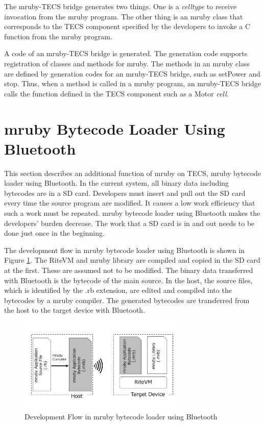 \documentclass[conference,compsoc]{IEEEtran}
\begin{document}
The mruby-TECS bridge generates two things.
One is a {\it celltype} to receive invocation from the mruby program.
The other thing is an mruby class that corresponds to the TECS component specified by the developers to invoke a C function from the mruby program.

A code of an mruby-TECS bridge is generated.
The generation code supports registration of classes and methods for mruby.
The methods in an mruby class are defined by generation codes for an mruby-TECS bridge, such as setPower and stop.
Thus, when a method is called in a mruby program, an mruby-TECS bridge calls the function defined in the TECS component such as a Motor {\it cell}.

 
\section{mruby Bytecode Loader Using Bluetooth}
\label{sec:mruby bytecode loader using Bluetooth}
This section describes an additional function of mruby on TECS, mruby bytecode loader using Bluetooth.
In the current system, all binary data including bytecodes are in a SD card.
Developers must insert and pull out the SD card every time the source program are modified.
It causes a low work efficiency that such a work must be repeated.
mruby bytecode loader using Bluetooth makes the developers' burden decrease.
The work that a SD card is in and out needs to be done just once in the beginning.

The development flow in mruby bytecode loader using Bluetooth is shown in Figure \ref{fig:bluetooth_loader}.
The RiteVM and mruby library are compiled and copied in the SD card at the first.
These are assumed not to be modified.
The binary data transferred with Bluetooth is the bytecode of the main source.
In the host, the source files, which is identified by the .rb extension, are edited and compiled into the bytecodes by a mruby compiler.
The generated bytecodes are transferred from the host to the target device with Bluetooth.

\begin{figure}[t]
    \centering
    \includegraphics[width=8cm,clip]{figure/bluetooth_loader.pdf}
    \caption{Development Flow in mruby bytecode loader using Bluetooth}
    \label{fig:bluetooth_loader}
\end{figure}
\end{document}
